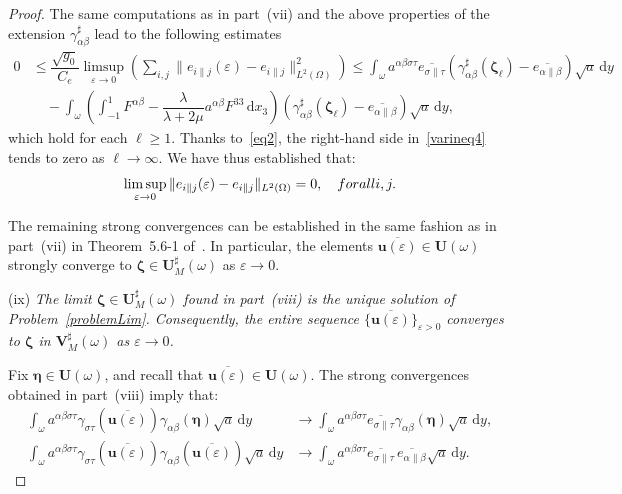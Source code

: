 \documentclass{amsart}
\def\dd{\, \mathrm{d}}
\begin{document}
\begin{proof}
The same computations as in part~(vii) and the above properties of the extension $\gamma_{\alpha\beta}^{\sharp}$ lead to the following estimates
\begin{equation}
	\label{varineq4}
	\begin{aligned}
		0&\le \dfrac{\sqrt{g_0}}{C_e}\limsup_{\varepsilon\to 0}\left(\sum_{i,j}\|e_{i\|j}(\varepsilon)-e_{i\|j}\|_{L^2(\Omega)}^2\right) \le 
		\int_{\omega} a^{\alpha\beta\sigma\tau} \overline{e_{\sigma\|\tau}} \left(\gamma_{\alpha\beta}^{\sharp}(\bm{\zeta}_\ell)-\overline{e_{\alpha\|\beta}}\right) \sqrt{a} \dd y\\
		&\quad - \int_{\omega} \left(\int_{-1}^{1} F^{\alpha\beta}-\dfrac{\lambda}{\lambda+2\mu} a^{\alpha\beta}F^{33} \dd x_3\right) \left(\gamma_{\alpha\beta}^{\sharp}(\bm{\zeta}_\ell)-\overline{e_{\alpha\|\beta}}\right) \sqrt{a} \dd y,
	\end{aligned}
\end{equation}
which hold for each $\ell\ge 1$. Thanks to~\eqref{eq2}, the right-hand side in~\eqref{varineq4} tends to zero as $\ell\to\infty$.
We have thus established that:
\begin{equation*}
	\limsup_{\varepsilon\to 0} \|e_{i\|j}(\varepsilon)-e_{i\|j}\|_{L^2(\Omega)} =0, \quad\textup{ for all } i,j.
\end{equation*}

The remaining strong convergences can be established in the same fashion as in part~(vii) in Theorem~5.6-1 of~\cite{Ciarlet2000}. In particular, the elements $\overline{\bm{u}(\varepsilon)} \in \bm{U}(\omega)$ strongly converge to $\bm{\zeta} \in \bm{U}_M^\sharp(\omega)$ as $\varepsilon\to0$.

(ix) \emph{The limit $\bm{\zeta} \in \bm{U}_M^\sharp(\omega)$ found in part~(viii) is the unique solution of Problem~\ref{problemLim}. Consequently, the entire sequence $\{\overline{\bm{u}(\varepsilon)}\}_{\varepsilon>0}$ converges to $\bm{\zeta}$ in $\bm{V}_M^\sharp(\omega)$ as $\varepsilon\to0$.}

Fix $\bm{\eta} \in\bm{U}(\omega)$, and recall that $\overline{\bm{u}(\varepsilon)} \in\bm{U}(\omega)$. The strong convergences obtained in part~(viii) imply that:
\begin{equation}
	\label{conv3}
	\begin{aligned}
		\int_{\omega}a^{\alpha\beta\sigma\tau} \gamma_{\sigma\tau}\left(\overline{\bm{u}(\varepsilon)}\right) \gamma_{\alpha\beta}(\bm{\eta}) \sqrt{a} \dd y &\to \int_{\omega}a^{\alpha\beta\sigma\tau} \overline{e_{\sigma\|\tau}} \gamma_{\alpha\beta}(\bm{\eta}) \sqrt{a} \dd y,\\
		\int_{\omega}a^{\alpha\beta\sigma\tau} \gamma_{\sigma\tau}\left(\overline{\bm{u}(\varepsilon)}\right) \gamma_{\alpha\beta}\left(\overline{\bm{u}(\varepsilon)}\right) \sqrt{a} \dd y &\to \int_{\omega}a^{\alpha\beta\sigma\tau} \overline{e_{\sigma\|\tau}}\,\overline{e_{\alpha\|\beta}} \sqrt{a} \dd y.
	\end{aligned}
\end{equation}


\end{proof}
\end{document}
